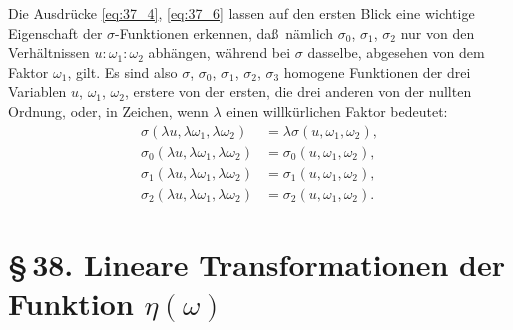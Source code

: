 \documentclass[12pt,a4paper]{article}
\begin{document}
Die Ausdr\"ucke \eqref{eq:37_4}, \eqref{eq:37_6} lassen auf den ersten Blick eine wichtige Eigenschaft der $\sigma$-Funktionen erkennen, da\ss\ n\"amlich $\sigma_0$, $\sigma_1$, $\sigma_2$ nur von den Verh\"altnissen $u:\omega_1:\omega_2$ abh\"angen, w\"ahrend bei $\sigma$ dasselbe, abgesehen von dem Faktor $\omega_1$, gilt. Es sind also $\sigma$, $\sigma_0$, $\sigma_1$, $\sigma_2$, $\sigma_3$ homogene Funktionen der drei Variablen $u$, $\omega_1$, $\omega_2$, erstere von der ersten, die drei anderen von der nullten Ordnung, oder, in Zeichen, wenn $\lambda$ einen willk\"urlichen Faktor bedeutet:
\begin{equation}\label{eq:37_8}
\begin{aligned}
\sigma(\lambda u,\lambda\omega_1,\lambda\omega_2) &= \lambda\sigma(u,\omega_1,\omega_2),\\
\sigma_0(\lambda u,\lambda\omega_1,\lambda\omega_2) &= \sigma_0(u,\omega_1,\omega_2),\\
\sigma_1(\lambda u,\lambda\omega_1,\lambda\omega_2) &= \sigma_1(u,\omega_1,\omega_2),\\
\sigma_2(\lambda u,\lambda\omega_1,\lambda\omega_2) &= \sigma_2(u,\omega_1,\omega_2).
\end{aligned}
\end{equation}


\section{\S\,38. Lineare Transformationen der Funktion $\eta(\omega)$}

\newpage
\end{document}
